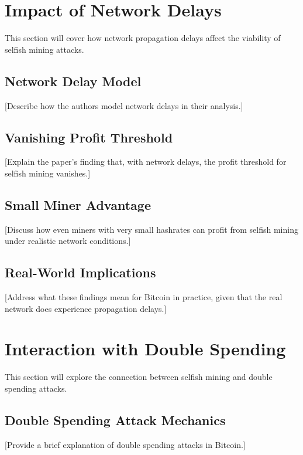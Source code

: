 \documentclass[conference]{IEEEtran}
\begin{document}
\section{Impact of Network Delays}

This section will cover how network propagation delays affect the viability of selfish mining attacks.

\subsection{Network Delay Model}

[Describe how the authors model network delays in their analysis.]

\subsection{Vanishing Profit Threshold}

[Explain the paper's finding that, with network delays, the profit threshold for selfish mining vanishes.]

\subsection{Small Miner Advantage}

[Discuss how even miners with very small hashrates can profit from selfish mining under realistic network conditions.]

\subsection{Real-World Implications}

[Address what these findings mean for Bitcoin in practice, given that the real network does experience propagation delays.]

\section{Interaction with Double Spending}

This section will explore the connection between selfish mining and double spending attacks.

\subsection{Double Spending Attack Mechanics}

[Provide a brief explanation of double spending attacks in Bitcoin.]
\end{document}
